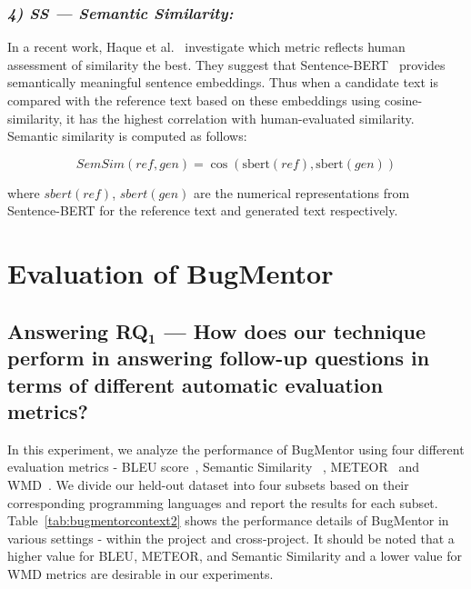 \subsubsection{\emph{\textit{4) SS --- Semantic Similarity: }}}

In a recent work, Haque et al.~\cite{haque2022semantic} investigate which metric reflects human assessment of similarity the best. They suggest that Sentence-BERT~\cite{reimers2019sentence} provides semantically meaningful sentence embeddings. Thus when a candidate text is compared with the reference text based on these embeddings using cosine-similarity, it has the highest correlation with human-evaluated similarity. Semantic similarity is computed as follows:

\begin{equation}
SemSim(ref, gen) = \cos(\text{sbert}(ref), \text{sbert}(gen))  
\end{equation}

where $sbert(ref)$, $sbert(gen)$ are the numerical representations from Sentence-BERT for the reference text and generated text respectively.\par

\section{Evaluation of BugMentor} \label{Chap1:Evaluation}
\label{sec:evaluation}


\subsection{Answering RQ$\mathbf{_1}$ --- How does our technique perform in answering follow-up questions in terms of different automatic evaluation metrics?}

In this experiment, we analyze the performance of BugMentor using four different evaluation metrics - \acrshort{BLEU} score~\cite{papineni2002bleu}, \acrlong{Semantic Similarity} ~\cite{haque2022semantic}, \acrshort{METEOR}~\cite{banerjee2005meteor} and WMD~\cite{huang2016supervised}. We divide our held-out dataset into four subsets based on their corresponding programming languages and report the results for each subset. Table~\ref{tab:bugmentorcontext2} shows the performance details of BugMentor in various settings - within the project and cross-project. It should be noted that a higher value for \acrshort{BLEU}, \acrshort{METEOR}, and \acrlong{Semantic Similarity} and a lower value for \acrshort{WMD} metrics are desirable in our experiments.\par

